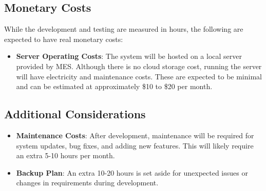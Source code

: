 \documentclass[12pt]{article}
\begin{document}
\subsection{Monetary Costs}
While the development and testing are measured in hours, the following are expected to have real monetary costs:
\begin{itemize}
    \item \textbf{Server Operating Costs}: The system will be hosted on a local server provided by MES. Although there is no cloud storage cost, running the server will have electricity and maintenance costs. These are expected to be minimal and can be estimated at approximately \$10 to \$20 per month.
\end{itemize}

\subsection{Additional Considerations}
\begin{itemize}
    \item \textbf{Maintenance Costs}: After development, maintenance will be required for system updates, bug fixes, and adding new features. This will likely require an extra 5-10 hours per month.
    \item \textbf{Backup Plan}: An extra 10-20 hours is set aside for unexpected issues or changes in requirements during development.
\end{itemize}
\end{document}
